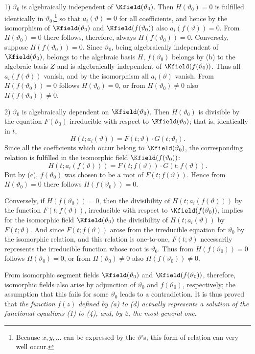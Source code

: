 1) \(\vartheta_0\) is algebraically independent of \(\Kfield(\vartheta_0)\). Then \(H(\vartheta_0)=0\) is fulfilled identically in \(\vartheta_0\),\footnote{Because \(x,y,\ldots\) can be expressed by the \(\vartheta\)'s, this form of relation can very well occur.} so that \(a_i(\vartheta)=0\) for all coefficients, and hence by the isomorphism of \(\Kfield(\vartheta_0)\) and \(\Kfield(f(\vartheta_0))\) also \(a_i(f(\vartheta))=0\). From \(H(\vartheta_0)=0\) there follows, therefore, always \(H(f(\vartheta_0))=0\). Conversely, suppose \(H(f(\vartheta_0))=0\). Since \(\vartheta_0\), being algebraically independent of \(\Kfield(\vartheta_0)\), belongs to the algebraic basis \(H\), \(f(\vartheta_0)\) belongs by (b) to the algebraic basis \(Z\) and is algebraically independent of \(\Kfield(f(\vartheta_0))\). Thus all \(a_i(f(\vartheta))\) vanish, and by the isomorphism all \(a_i(\vartheta)\) vanish. From \(H(f(\vartheta_0))=0\) follows \(H(\vartheta_0)=0\), or from \(H(\vartheta_0)\ne0\) also \(H(f(\vartheta_0))\ne0\).

2) \(\vartheta_0\) is algebraically dependent on \(\Kfield(\vartheta_0)\). Then \(H(\vartheta_0)\) is divisible by the equation \(F(\vartheta_0)\) irreducible with respect to \(\Kfield(\vartheta_0)\); that is, identically in \(t\),
\[
H(t;a_i(\vartheta))=F(t;\vartheta)\cdot G(t;\vartheta_i).
\]
Since all the coefficients which occur belong to \(\Kfield(\vartheta_0)\), the corresponding relation is fulfilled in the isomorphic field \(\Kfield(f(\vartheta_0))\):
\[
H(t;a_i(f(\vartheta)))=F(t;f(\vartheta))\cdot G(t;f(\vartheta)).
\]
But by (c), \(f(\vartheta_0)\) was chosen to be a root of \(F(t;f(\vartheta))\). Hence from \(H(\vartheta_0)=0\) there follows \(H(f(\vartheta_0))=0\).

Conversely, if \(H(f(\vartheta_0))=0\), then the divisibility of \(H(t;a_i(f(\vartheta)))\) by the function \(F(t;f(\vartheta))\), irreducible with respect to \(\Kfield(f(\vartheta_0))\), implies for the isomorphic field \(\Kfield(\vartheta_0)\) the divisibility of \(H(t;a_i(\vartheta))\) by \(F(t;\vartheta)\). And since \(F(t;f(\vartheta))\) arose from the irreducible equation for \(\vartheta_0\) by the isomorphic relation, and this relation is one-to-one, \(F(t;\vartheta)\) necessarily represents the irreducible function whose root is \(\vartheta_0\). Thus from \(H(f(\vartheta_0))=0\) follows \(H(\vartheta_0)=0\), or from \(H(\vartheta_0)\ne0\) also \(H(f(\vartheta_0))\ne0\).

From isomorphic segment fields \(\Kfield(\vartheta_0)\) and \(\Kfield(f(\vartheta_0))\), therefore, isomorphic fields also arise by adjunction of \(\vartheta_0\) and \(f(\vartheta_0)\), respectively; the assumption that this fails for some \(\vartheta_0\) leads to a contradiction. It is thus proved that \emph{the function} \(f(z)\) \emph{defined by (a) to (d) actually represents a solution of the functional equations (1) to (4), and, by 2, the most general one}.

